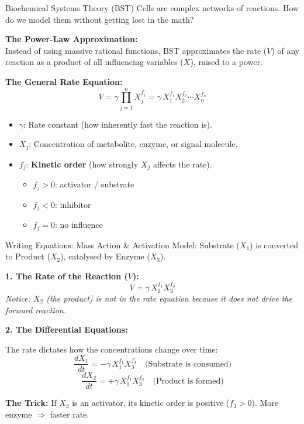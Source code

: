 
\begin{frame}{Biochemical Systems Theory (BST)}
Cells are complex networks of reactions. How do we model them without getting lost in the math?

\textbf{The Power-Law Approximation:} \\
Instead of using massive rational functions, BST approximates the rate ($V$) of any reaction as a product of all influencing variables ($X$), raised to a power.

\vspace{0.4cm}

\textbf{The General Rate Equation:}
\[
V = \gamma \prod_{j=1}^{n} X_j^{f_j} = \gamma\, X_1^{f_1} X_2^{f_2} \cdots X_n^{f_n}
\]

\begin{itemize}
    \item $\gamma$: Rate constant (how inherently fast the reaction is).
    \item $X_j$: Concentration of metabolite, enzyme, or signal molecule.
    \item $f_j$: \textbf{Kinetic order} (how strongly $X_j$ affects the rate).
        \begin{itemize}
            \item $f_j > 0$: activator / substrate
            \item $f_j < 0$: inhibitor
            \item $f_j = 0$: no influence
        \end{itemize}
\end{itemize}
\end{frame}

\begin{frame}{Writing Equations: Mass Action \& Activation}
Model: Substrate ($X_1$) is converted to Product ($X_2$), catalysed by Enzyme ($X_3$).

\vspace{0.3cm}

\textbf{1. The Rate of the Reaction ($V$):}
\[
V = \gamma\, X_1^{f_1} X_3^{f_3}
\]
\textit{Notice: $X_2$ (the product) is not in the rate equation because it does not drive the forward reaction.}

\textbf{2. The Differential Equations:}

The rate dictates how the concentrations change over time:
\[
\frac{dX_1}{dt} = - \gamma\, X_1^{f_1} X_3^{f_3} \quad \text{(Substrate is consumed)}
\]
\[
\frac{dX_2}{dt} = + \gamma\, X_1^{f_1} X_3^{f_3} \quad \text{(Product is formed)}
\]

\textbf{The Trick:} If $X_3$ is an activator, its kinetic order is positive ($f_3 > 0$). More enzyme $\Rightarrow$ faster rate.
\end{frame}

